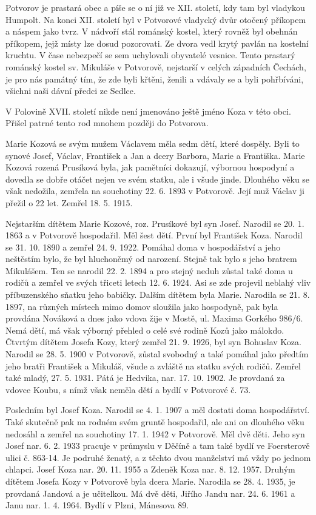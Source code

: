 \documentclass[../dejiny-rodu-prusiku.tex]{subfiles}
\begin{document}
Potvorov je prastará obec a píše se o ní již ve XII. století, kdy tam byl vladykou Humpolt. Na konci XII. století byl v Potvorové vladycký dvůr otočený příkopem a náspem jako tvrz. V nádvoří stál románský kostel, který rovněž byl obehnán příkopem, jejž místy lze dosud pozorovati. Ze dvora vedl krytý pavlán na kostelní kruchtu. V čase nebezpečí se sem uchylovali obyvatelé vesnice. Tento prastarý románský kostel sv. Mikuláše v Potvorově, nejstarší v celých západních Čechách, je pro nás památný tím, že zde byli křtěni, ženili a vdávaly se a byli pohřbíváni, všichni naši dávní předci ze Sedlce.

V Polovině XVII. století nikde není jmenováno ještě jméno Koza v této obci. Přišel patrné tento rod mnohem později do Potvorova.

Marie Kozová se svým mužem Václavem měla sedm dětí, které dospěly. Byli to synové Josef, Václav, František a Jan a dcery Barbora, Marie a Františka. Marie Kozová rozená Prusíková byla, jak pamětníci dokazují, výbornou hospodyní a dovedla se dobře otáčet nejen ve svém statku, ale i všude jinde. Dlouhého věku se však nedožila, zemřela na souchotiny 22. 6. 1893 v Potvorově. Její muž Václav ji přežil o 22 let. Zemřel 18. 5. 1915.

Nejstarším dítětem Marie Kozové, roz. Prusíkové byl syn Josef. Narodil se 20. 1. 1863 a v Potvorově hospodařil. Měl šest dětí. První byl František Koza. Narodil se 31. 10. 1890 a zemřel 24. 9. 1922. Pomáhal doma v hospodářství a jeho neštěstím bylo, že byl hluchoněmý od narození. Stejně tak bylo s jeho bratrem Mikulášem. Ten se narodil 22. 2. 1894 a pro stejný neduh zůstal také doma u rodičů a zemřel ve svých třiceti letech 12. 6. 1924. Asi se zde projevil neblahý vliv příbuzenského sňatku jeho babičky. Dalším dítětem byla Marie. Narodila se 21. 8. 1897, na různých místech mimo domov sloužila jako hospodyně, pak byla provdána Nováková a dnes jako vdova žije v Mostě, ul. Maxima Gorkého 986/6. Nemá dětí, má však výborný přehled o celé své rodině Kozů jako málokdo. Čtvrtým dítětem Josefa Kozy, který zemřel 21. 9. 1926, byl syn Bohuslav Koza. Narodil se 28. 5. 1900 v Pot­vorově, zůstal svobodný a také pomáhal jako předtím jeho bratři František a Mikuláš, všude a zvláště na statku svých rodičů. Zemřel také mladý, 27. 5. 1931. Pátá je Hedvika, nar. 17. 10. 1902. Je provdaná za vdovce Koubu, s nímž však neměla dětí a bydlí v Potvorové č. 73.

Posledním byl Josef Koza. Narodil se 4. 1. 1907 a měl dostati doma hospodářství. Také skutečně pak na rodném svém gruntě hospodařil, ale ani on dlouhého věku ne­dosáhl a zemřel na souchotiny 17. 1. 1942 v Potvorově. Měl dvě děti. Jeho syn Josef nar. 6. 2. 1933 pracuje v průmyslu v Děčíně a tam také bydlí ve Foersterově uli­ci č. 863-14. Je podruhé ženatý, a z těchto dvou manžel­ství má vždy po jednom chlapci. Josef Koza nar. 20. 11. 1955 a Zdeněk Koza nar. 8. 12. 1957. Druhým dítětem Josefa Kozy v Potvorově byla dcera Marie. Narodila se 28. 4. 1935, je provdaná Jandová a je učitelkou. Má dvě dě­ti, Jiřího Jandu nar. 24. 6. 1961 a Janu nar. 1. 4. 1964. Bydlí v Plzni, Mánesova 89.
\end{document}
